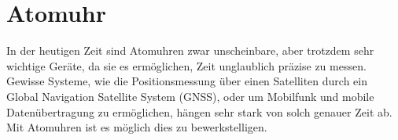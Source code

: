 \chapter{Atomuhr\label{chapter:atomuhr}}
\begin{refsection}

%

In der heutigen Zeit sind Atomuhren zwar unscheinbare, aber trotzdem sehr wichtige Geräte, da sie es ermöglichen, Zeit unglaublich präzise zu messen. 
Gewisse Systeme, wie die Positionsmessung über einen Satelliten durch ein Global Navigation Satellite System (GNSS), oder um Mobilfunk und mobile Datenübertragung zu ermöglichen, hängen sehr stark von solch genauer Zeit ab.
Mit Atomuhren ist es möglich dies zu bewerkstelligen. %

	







\printbibliography[heading=subbibliography]
\end{refsection}

